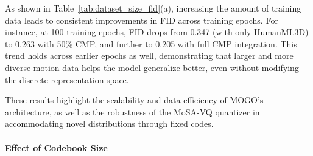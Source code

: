\documentclass[a4paper,12pt]{article}
\begin{document}
As shown in Table~\ref{tab:dataset_size_fid}(a), increasing the amount of training data leads to consistent improvements in FID across training epochs. For instance, at 100 training epochs, FID drops from 0.347 (with only HumanML3D) to 0.263 with 50\% CMP, and further to 0.205 with full CMP integration. This trend holds across earlier epochs as well, demonstrating that larger and more diverse motion data helps the model generalize better, even without modifying the discrete representation space.

These results highlight the scalability and data efficiency of MOGO’s architecture, as well as the robustness of the MoSA-VQ quantizer in accommodating novel distributions through fixed codes.


\paragraph{Effect of Codebook Size}

\begin{table}[t]

  \centering
  \small
  \setlength{\tabcolsep}{7pt} %
  \renewcommand{\arraystretch}{1.2} %

    \caption{Study on the number of codes in codebook on HumanML3D~\cite{guo2022generating} test set. \textbf{Bold} indicates the best FID result.}
  \label{ablation:codebooksize}
\end{table}
\end{document}
